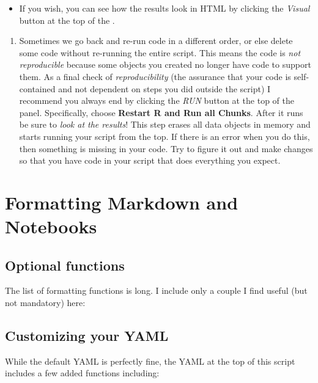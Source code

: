 \documentclass[
]{book}
\providecommand{\tightlist}{%
  \setlength{\itemsep}{0pt}\setlength{\parskip}{0pt}}
\begin{document}
\begin{itemize}
\tightlist
\item
  If you wish, you can see how the results look in HTML by clicking the \emph{Visual} button at the top of the .
\end{itemize}

\begin{enumerate}
\def\labelenumi{\arabic{enumi}.}
\setcounter{enumi}{3}
\tightlist
\item
  Sometimes we go back and re-run code in a different order, or else delete some code without re-running the entire script. This means the code is \emph{not reproducible} because some objects you created no longer have code to support them. As a final check of \emph{reproducibility} (the assurance that your code is self-contained and not dependent on steps you did outside the script) I recommend you always end by clicking the \emph{RUN} button at the top of the panel. Specifically, choose \textbf{Restart R and Run all Chunks}. After it runs be sure to \emph{look at the results}! This step erases all data objects in memory and starts running your script from the top. If there is an error when you do this, then something is missing in your code. Try to figure it out and make changes so that you have code in your script that does everything you expect.
\end{enumerate}

\hypertarget{formatting-markdown-and-notebooks}{%
\chapter{Formatting Markdown and Notebooks}\label{formatting-markdown-and-notebooks}}

\hypertarget{optional-functions}{%
\section{Optional functions}\label{optional-functions}}

The list of formatting functions is long. I include only a couple I find useful (but not mandatory) here:

\hypertarget{customizing-your-yaml}{%
\section{Customizing your YAML}\label{customizing-your-yaml}}

While the default YAML is perfectly fine, the YAML at the top of this script includes a few added functions including:
\end{document}

